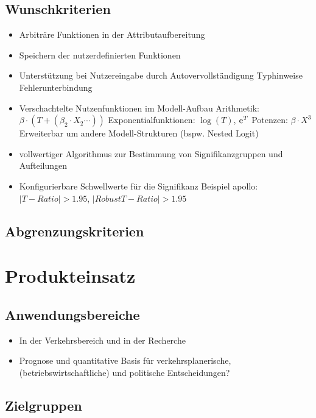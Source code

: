 \documentclass{article}
\begin{document}
\subsection{Wunschkriterien}
\begin{itemize}
    \item Arbiträre Funktionen in der Attributaufbereitung
    \item Speichern der nutzerdefinierten Funktionen
    \item Unterstützung bei Nutzereingabe durch
        \subitem Autovervollständigung
        \subitem Typhinweise
        \subitem Fehlerunterbindung
    \item Verschachtelte Nutzenfunktionen im Modell-Aufbau
        \subitem Arithmetik: $\beta \cdot (T + (\beta_2 \cdot X_2 \cdots))$
        \subitem Exponentialfunktionen: $\log(T)$, ${\rm e}^T$
        \subitem Potenzen: $\beta \cdot X^3$
        \subitem Erweiterbar um andere Modell-Strukturen (bspw. Nested Logit) 
    \item vollwertiger Algorithmus zur Bestimmung von Signifikanzgruppen und Aufteilungen
    \item Konfigurierbare Schwellwerte für die Signifikanz
        \subitem Beispiel apollo: $|T-Ratio | > 1.95$, $|Robust T-Ratio | > 1.95$
    
\end{itemize}
\subsection{Abgrenzungskriterien}
    
\section{Produkteinsatz}
\subsection{Anwendungsbereiche}
\begin{itemize}
    \item In der Verkehrsbereich und in der Recherche
\end{itemize}
\begin{itemize}
    \item Prognose und quantitative Basis für verkehrsplanerische, (betriebswirtschaftliche) und politische Entscheidungen?
\end{itemize}
\subsection{Zielgruppen}
\end{document}
